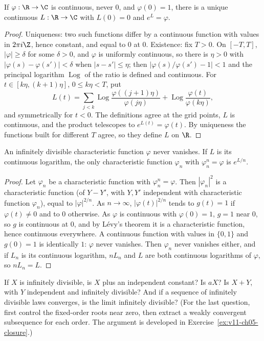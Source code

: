 \begin{lemma}\label{lem:contlog}
If $\varphi:\R\to\C$ is continuous, never $0$, and $\varphi(0)=1$, there is a unique continuous $L:\R\to\C$ with $L(0)=0$ and $e^L=\varphi$.
\end{lemma}
\begin{proof}
Uniqueness: two such functions differ by a continuous function with values in $2\pi i\Z$, hence constant, and equal to $0$ at $0$. Existence: fix $T>0$. On
$[-T,T]$, $|\varphi|\ge\delta$ for some $\delta>0$, and $\varphi$ is uniformly continuous, so there is $\eta>0$ with $|\varphi(s)-\varphi(s')|<\delta$ when
$|s-s'|\le\eta$; then $|\varphi(s)/\varphi(s')-1|<1$ and the principal logarithm $\operatorname{Log}$ of the ratio is defined and continuous. For $t\in[k\eta,(k+1)\eta]$,
$0\le k\eta<T$, put
\[
L(t)=\sum_{j<k}\operatorname{Log}\frac{\varphi((j+1)\eta)}{\varphi(j\eta)}+\operatorname{Log}\frac{\varphi(t)}{\varphi(k\eta)},
\]
and symmetrically for $t<0$. The definitions agree at the grid points, $L$ is continuous, and the product telescopes to $e^{L(t)}=\varphi(t)$. By uniqueness
the functions built for different $T$ agree, so they define $L$ on $\R$.
\end{proof}

\begin{proposition}\label{prop:idroot}
An infinitely divisible characteristic function $\varphi$ never vanishes. If $L$ is its continuous logarithm, the only characteristic function $\varphi_n$ with
$\varphi_n^n=\varphi$ is $e^{L/n}$.
\end{proposition}
\begin{proof}
Let $\varphi_n$ be a characteristic function with $\varphi_n^n=\varphi$. Then $|\varphi_n|^2$ is a characteristic function (of $Y-Y'$, with $Y,Y'$ independent with
characteristic function $\varphi_n$), equal to $|\varphi|^{2/n}$. As $n\to\infty$, $|\varphi(t)|^{2/n}$ tends to $g(t)=1$ if $\varphi(t)\ne0$ and to $0$ otherwise. As
$\varphi$ is continuous with $\varphi(0)=1$, $g=1$ near $0$, so $g$ is continuous at $0$, and by L\'evy's theorem it is a characteristic function, hence continuous
everywhere. A continuous function with values in $\{0,1\}$ and $g(0)=1$ is identically $1$: $\varphi$ never vanishes. Then $\varphi_n$ never vanishes either,
and if $L_n$ is its continuous logarithm, $nL_n$ and $L$ are both continuous logarithms of $\varphi$, so $nL_n=L$.
\end{proof}

\begin{think}
If $X$ is infinitely divisible, is $X$ plus an independent constant? Is $aX$? Is $X+Y$, with $Y$ independent and infinitely divisible? And if a sequence of
infinitely divisible laws converges, is the limit infinitely divisible? (For the last question, first control the fixed-order roots near zero, then extract a weakly convergent subsequence for each order. The argument is developed in Exercise~\ref{ex:v11-ch05-closure}.)
\end{think}

